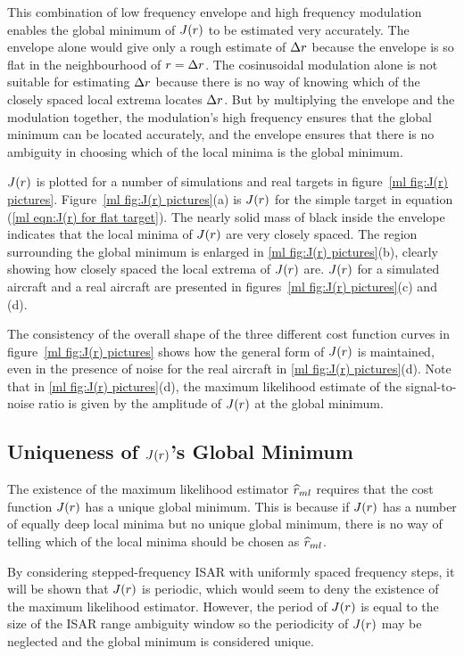 This combination of low frequency envelope and high frequency modulation
enables the global minimum of $J({r})$ to be estimated very accurately.  The
envelope alone would give only a rough estimate of ${\Delta r}$ because
the envelope is so flat in the neighbourhood of ${r}={\Delta r}$.  The
cosinusoidal modulation alone is not suitable for estimating ${\Delta r}$
because there is no way of knowing which of the closely spaced local extrema
locates ${\Delta r}$.  But by multiplying the envelope and the modulation
together, the modulation's high frequency ensures that the global minimum 
can be located accurately, and the envelope ensures that there is no 
ambiguity in choosing which of the local minima is the global minimum.

$J({r})$ is plotted for a number of simulations and real targets in 
figure~\ref{ml fig:J(r) pictures}.  Figure~\ref{ml fig:J(r) pictures}(a) is 
$J({r})$ for the simple target in equation (\ref{ml eqn:J(r) for flat target}).  
The nearly solid mass of black inside the envelope indicates that the local 
minima of $J({r})$ are very closely spaced.  The region surrounding the global 
minimum is enlarged in \ref{ml fig:J(r) pictures}(b), clearly showing how 
closely spaced the local extrema of $J({r})$ are.  $J({r})$ for a simulated 
aircraft and a real aircraft are presented in 
figures~\ref{ml fig:J(r) pictures}(c) and (d).  

The consistency of the overall shape of the three different cost function curves
in figure~\ref{ml fig:J(r) pictures} shows how the general form of $J({r})$ is 
maintained, even in the presence of noise for the
real aircraft in \ref{ml fig:J(r) pictures}(d).  Note that in 
\ref{ml fig:J(r) pictures}(d), the maximum likelihood estimate of the 
signal-to-noise ratio is given by the amplitude of $J({r})$ at the 
global minimum.

\subsection{Uniqueness of $J({r})$'s Global Minimum}
\label{ml sec:J(r)'s period}

The existence of the maximum likelihood estimator $\widehat{r}_{ml}$ requires that the 
cost function $J({r})$ has a unique global minimum.  This is because if
$J({r})$ has a number of equally deep local minima  but no unique global 
minimum, there is no way of telling which of the local minima should be
chosen as $\widehat{r}_{ml}$.

By considering stepped-frequency ISAR with uniformly spaced frequency
steps, it will be shown that $J({r})$ is periodic, which would seem to deny
the existence of the maximum likelihood estimator.  However, the period of
$J({r})$ is equal to the size of the ISAR range ambiguity window so the
periodicity of $J({r})$ may be neglected and the global minimum is considered
unique.

